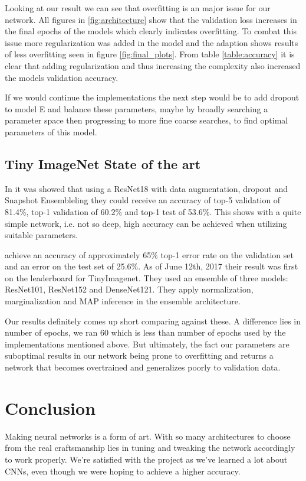 \documentclass{kthreport}
\begin{document}
Looking at our result we can see that overfitting is an major issue for our network.
All figures in \ref{fig:architecture} show that the validation loss increases in the final epochs of the models which clearly indicates overfitting.
To combat this issue more regularization was added in the model and the adaption shows results of less overfitting seen in figure \ref{fig:final_plots}.
From table \ref{table:accuracy} it is clear that adding regularization and thus increasing the complexity also increased the models validation accuracy.

If we would continue the implementations the next step would be to add dropout to model E and balance these parameters, maybe by broadly searching a parameter space then progressing to more fine coarse searches, to find optimal parameters of this model.


\subsection{Tiny ImageNet State of the art}

In \cite{BarnesStanford} it was showed that using a ResNet18 with data augmentation, dropout and Snapshot Ensembleling they could receive an accuracy of top-5 validation of 81.4\%, top-1 validation of 60.2\% and top-1 test of 53.6\%. This shows with a quite simple network, i.e. not so deep, high accuracy can be achieved when utilizing suitable parameters.

\cite{vCheung} achieve an accuracy of approximately 65\% top-1 error rate on the validation set and an error on the test set of 25.6\%. As of June 12th, 2017 their result was first on the leaderboard for TinyImagenet. They used an ensemble of three models: ResNet101, ResNet152 and DenseNet121. They apply normalization, marginalization and MAP inference in the ensemble architecture.

Our results definitely comes up short comparing against these. A difference lies in number of epochs, we ran 60 which is less than number of epochs used by the implementations mentioned above. But ultimately, the fact our parameters are suboptimal results in our network being prone to overfitting and returns a network that becomes overtrained and generalizes poorly to validation data.

\section{Conclusion}
Making neural networks is a form of art. With so many architectures to choose from the real craftsmanship lies in tuning and tweaking the network accordingly to work properly. We're satisfied with the project as we've learned a lot about CNNs, even though we were hoping to achieve a higher accuracy.


{}

\end{document}
